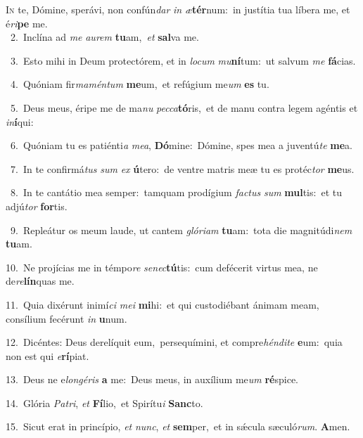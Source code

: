 \lettrine{\initial\textcolor{\initialcolor}{I}}{n} te, Dómine, sperávi, non confún\textit{dar} \textit{in} \textit{æ}\-\textbf{tér}num:~\star in justítia tua líbera me, et é\-\textit{ri}\-\textbf{pe} me.\\
{\numbfont\textcolor{\numbcolor}{~2.}}~Inclína ad \textit{me} \textit{au}\-\textit{rem} \textbf{tu}\-am,~\star \textit{et} \textbf{sal}\-va me.\par
{\numbfont\textcolor{\numbcolor}{~3.}}~Esto mihi in Deum protectórem, et in \textit{lo}\-\textit{cum} \textit{mu}\-\textbf{ní}tum:~\star ut salvum \textit{me} \textbf{fá}\-cias.\par
{\numbfont\textcolor{\numbcolor}{~4.}}~Quóniam fir\-\textit{ma}\-\textit{mén}\textit{tum} \textbf{me}\-um,~\star et refúgium me\textit{um} \textbf{es} tu.\par
{\numbfont\textcolor{\numbcolor}{~5.}}~Deus meus, éripe me de ma\textit{nu} \textit{pec}\-\textit{ca}\textbf{tó}ris,~\star et de manu contra legem agéntis et \textit{in}\-\textbf{í}qui:\par
{\numbfont\textcolor{\numbcolor}{~6.}}~Quóniam tu es patiénti\textit{a} \textit{me}\-\textit{a}, \textbf{Dó}\-mine:~\star Dómine, spes mea a juventú\textit{te} \textbf{me}\-a.\par
{\numbfont\textcolor{\numbcolor}{~7.}}~In te confirmá\textit{tus} \textit{sum} \textit{ex} \textbf{ú}\-tero:~\star de ventre matris meæ tu es protéc\textit{tor} \textbf{me}\-us.\par
{\numbfont\textcolor{\numbcolor}{~8.}}~In te cantátio mea semper:~\dagger tamquam prodígium \textit{fac}\-\textit{tus} \textit{sum} \textbf{mul}\-tis:~\star et tu adjú\textit{tor} \textbf{for}\-tis.\par
{\numbfont\textcolor{\numbcolor}{~9.}}~Repleátur os meum laude, ut cantem \textit{gló}\-\textit{ri}\textit{am} \textbf{tu}\-am:~\star tota die magnitúdi\textit{nem} \textbf{tu}\-am.\par
{\numbfont\textcolor{\numbcolor}{10.}}~Ne projícias me in témpo\textit{re} \textit{se}\-\textit{nec}\textbf{tú}tis:~\star cum defécerit virtus mea, ne de\-\textit{re}\-\textbf{lín}quas me.\par
{\numbfont\textcolor{\numbcolor}{11.}}~Quia dixérunt inimí\textit{ci} \textit{me}\-\textit{i} \textbf{mi}\-hi:~\star et qui custodiébant ánimam meam, consílium fecérunt \textit{in} \textbf{u}\-num.\par
{\numbfont\textcolor{\numbcolor}{12.}}~Dicéntes: Deus derelíquit eum,~\dagger persequímini, et compre\-\textit{hén}\-\textit{di}\textit{te} \textbf{e}\-um:~\star quia non est qui \textit{e}\-\textbf{rí}piat.\par
{\numbfont\textcolor{\numbcolor}{13.}}~Deus ne e\-\textit{lon}\-\textit{gé}\textit{ris} \textbf{a} me:~\star Deus meus, in auxílium me\textit{um} \textbf{ré}\-spice.\par
{\numbfont\textcolor{\numbcolor}{14.}}~Glória \textit{Pa}\-\textit{tri}, \textit{et} \textbf{Fí}\-lio,~\star et Spirítu\textit{i} \textbf{Sanc}\-to.\par
{\numbfont\textcolor{\numbcolor}{15.}}~Sicut erat in princípio, \textit{et} \textit{nunc}\-, \textit{et} \textbf{sem}\-per,~\star et in sǽcula sæculó\-\textit{rum}\-. \textbf{A}\-men.\par

